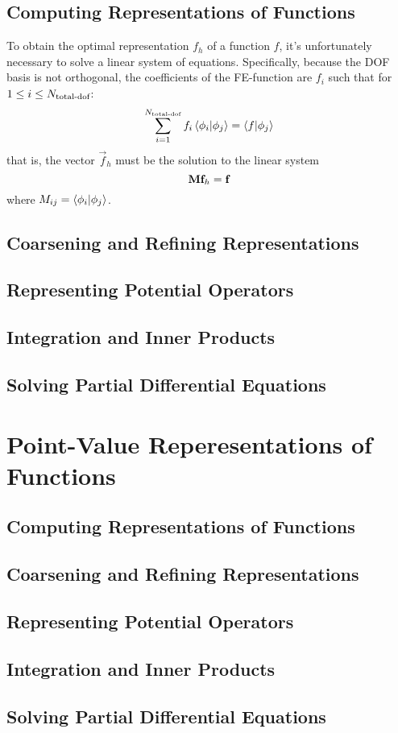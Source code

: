 \subsection{Computing Representations of Functions}

To obtain the optimal representation $f_h$ of a function $f$, it's
unfortunately necessary to solve a linear system of
equations. Specifically, because the DOF basis is not orthogonal, the
coefficients of the FE-function are $f_i$ such that for $1\le i \le {N_{\text{total-dof}}}$:
\begin{equation}
  \sum_{i=1}^{N_{\text{total-dof}}} f_i \left\langle \phi_i\middle|\phi_j\right\rangle = \left\langle f\middle|\phi_j\right\rangle
\end{equation}
that is, the vector $\vec{f}_h$ must be the solution to the linear system
\begin{equation}
  \mathbf{M}\mathbf{f}_h = \mathbf{f}
\end{equation}
where $M_{ij} = \left\langle \phi_i\middle|\phi_j\right\rangle$.
\subsection{Coarsening and Refining Representations}

\subsection{Representing Potential Operators}


\subsection{Integration and Inner Products}

\subsection{Solving Partial Differential Equations}


\section{Point-Value Reperesentations of Functions}

\subsection{Computing Representations of Functions}

\subsection{Coarsening and Refining Representations}

\subsection{Representing Potential Operators}

\subsection{Integration and Inner Products}

\subsection{Solving Partial Differential Equations}


